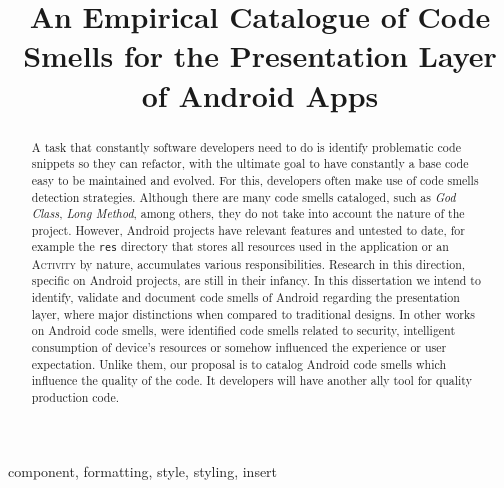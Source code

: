 \documentclass[conference]{IEEEtran}
\begin{document}
\title{An Empirical Catalogue of Code Smells for the Presentation Layer of Android Apps}

\author{
\and
{}
\and
{}
}

\maketitle

\begin{abstract} 
A task that constantly software developers need to do is
identify problematic code snippets so they can refactor, with the ultimate
goal to have constantly a base code easy to be maintained and evolved. For
this, developers often make use of code smells detection strategies. Although
there are many code smells cataloged, such as \textit{God Class}, \textit{Long
Method}, among others, they do not take into account the nature of the
project. However, Android projects have relevant features and untested to
date, for example the \texttt{res} directory that stores all resources used in
the application or an \textsc{Activity} by nature, accumulates various
responsibilities. Research in this direction, specific on Android projects,
are still in their infancy. In this dissertation we intend to identify,
validate and document code smells of Android regarding the presentation layer,
where major distinctions when compared to traditional designs. In other works
on Android code smells, were identified code smells related to security,
intelligent consumption of device's resources or somehow influenced the
experience or user expectation. Unlike them, our proposal is to catalog
Android code smells which influence the quality of the code. It developers
will have another ally tool for quality production code. 
\end{abstract}

\begin{IEEEkeywords}
component, formatting, style, styling, insert
\end{IEEEkeywords}











\end{document}
